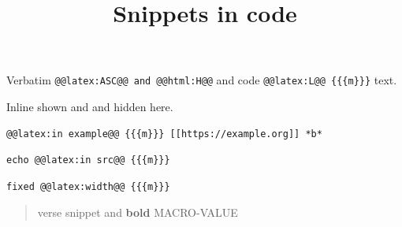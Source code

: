 \documentclass[11pt]{article}
\date{}
\title{Snippets in code}
\begin{document}
\maketitle
Verbatim \texttt{@@latex:ASC@@ and @@html:H@@} and code \texttt{@@latex:L@@ \{\{\{m\}\}\}} text.

Inline shown and  and hidden here.

\begin{verbatim}
@@latex:in example@@ {{{m}}} [[https://example.org]] *b*
\end{verbatim}

\begin{verbatim}
echo @@latex:in src@@ {{{m}}}
\end{verbatim}

\begin{verbatim}
fixed @@latex:width@@ {{{m}}}
\end{verbatim}


\begin{verse}
verse snippet and \textbf{bold} MACRO-VALUE\\[0pt]
\end{verse}
\end{document}
